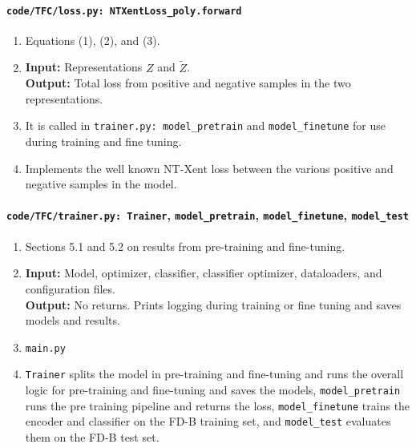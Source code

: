 \documentclass[a4paper,11pt]{article}
\newcommand{\code}[1]{\texttt{#1}}
\begin{document}
\paragraph{\code{code/TFC/loss.py: NTXentLoss\_poly.forward}}
\begin{enumerate}[label=(\roman*)]
\item Equations (1), (2), and (3).
\item 
    \textbf{Input:} Representations $Z$ and $\tilde{Z}$.\\
    \textbf{Output:} Total loss from positive and negative samples in the two representations.
\item It is called in \texttt{trainer.py: model\_pretrain} and \texttt{model\_finetune} for use during training and fine tuning.
\item Implements the well known NT-Xent loss between the various positive and negative samples in the model.
\end{enumerate}

\paragraph{\code{code/TFC/trainer.py: Trainer}, \code{model\_pretrain}, \code{model\_finetune}, \code{model\_test}}
\begin{enumerate}[label=(\roman*)]
\item Sections 5.1 and 5.2 on results from pre-training and fine-tuning.
\item 
    \textbf{Input:} Model, optimizer, classifier, classifier optimizer, dataloaders, and configuration files.\\
    \textbf{Output:} No returns. Prints logging during training or fine tuning and saves models and results.
\item \code{main.py}
\item \code{Trainer} splits the model in pre-training and fine-tuning and runs the overall logic for pre-training and fine-tuning and saves the models, \code{model\_pretrain} runs the pre training pipeline and returns the loss, \code{model\_finetune} trains the encoder and classifier on the FD-B training set, and \code{model\_test} evaluates them on the FD-B test set.
\end{enumerate}
\end{document}
